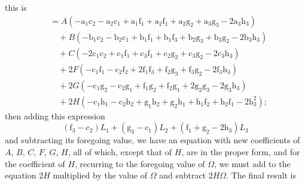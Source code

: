 \documentclass[11pt,a4paper]{article}
\begin{document}
\thispagestyle{plain}
\noindent this is
\begin{align*}
&= A(-\text{a}_{1}\text{c}_{2} - \text{a}_{2}\text{c}_{1} + \text{a}_{1}\text{f}_{1} + \text{a}_{2}\text{f}_{1} + \text{a}_{2}\text{g}_{2} + \text{a}_{3}\text{g}_{3} - 2\text{a}_{3}\text{h}_{3})\\
&\quad + B(-\text{b}_{1}\text{c}_{2} - \text{b}_{2}\text{c}_{1} + \text{b}_{1}\text{f}_{1} + \text{b}_{1}\text{f}_{3} + \text{b}_{2}\text{g}_{3} + \text{b}_{3}\text{g}_{2} - 2\text{b}_{3}\text{h}_{3})\\
&\quad + C(-2\text{c}_{1}\text{c}_{2} + \text{c}_{1}\text{f}_{1} + \text{c}_{3}\text{f}_{1} + \text{c}_{2}\text{g}_{2} + \text{c}_{3}\text{g}_{2} - 2\text{c}_{3}\text{h}_{3})\\
&\quad + 2F(-\text{c}_{1}\text{f}_{1} - \text{c}_{2}\text{f}_{2} + 2\text{f}_{1}\text{f}_{3} + \text{f}_{2}\text{g}_{3} + \text{f}_{3}\text{g}_{2} - 2\text{f}_{3}\text{h}_{3})\\
&\quad + 2G(-\text{c}_{1}\text{g}_{2} - \text{c}_{2}\text{g}_{1} + \text{f}_{1}\text{g}_{2} + \text{f}_{2}\text{g}_{1} + 2\text{g}_{2}\text{g}_{3} - 2\text{g}_{3}\text{h}_{3})\\
&\quad + 2H(-\text{c}_{1}\text{h}_{1} - \text{c}_{2}\text{h}_{2} + \text{g}_{1}\text{h}_{2} + \text{g}_{2}\text{h}_{1} + \text{h}_{1}\text{f}_{2} + \text{h}_{2}\text{f}_{1} - 2\text{h}_{3}^{2});
\end{align*}
then adding this expression
\[
(\text{f}_{3} - \text{c}_{2})L_{1} + (\text{g}_{3} - \text{c}_{1})L_{2} + (\text{f}_{1} + \text{g}_{2} - 2\text{h}_{3})L_{3}
\]
and subtracting its foregoing value, we have an equation with new coefficients of $A$, $B$, $C$, $F$, $G$, $H$, all of which, except that of $H$, are in the proper form, and for the coefficient of $H$, recurring to the foregoing value of $\Omega$, we must add to the equation $2H$ multiplied by the value of $\Omega$ and subtract $2H\Omega$. The final result is
\end{document}
